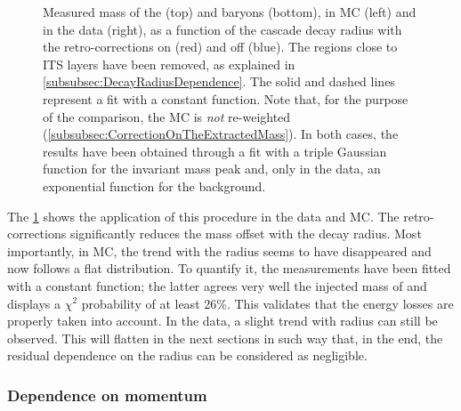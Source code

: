 \begin{figure}[p]
\hspace*{-2.cm}
\hspace*{-2.cm}
\caption{Measured mass of the \rmXi (top) and \rmOmega baryons (bottom), in MC (left) and in the data (right), as a function of the cascade decay radius with the retro-corrections on (red) and off (blue). The regions close to ITS layers have been removed, as explained in \Sec\ref{subsubsec:DecayRadiusDependence}. The solid and dashed lines represent a fit with a constant function. Note that, for the purpose of the comparison, the MC is \textit{not} re-weighted (\Sec\ref{subsubsec:CorrectionOnTheExtractedMass}). In both cases, the results have been obtained through a fit with a triple Gaussian function for the invariant mass peak and, only in the data, an exponential function for the background.}
	\label{fig:MassVsRadiusAfterRetrocorrection}
\end{figure}

The \fig\ref{fig:MassVsRadiusAfterRetrocorrection} shows the application of this procedure in the data and MC. The retro-corrections significantly reduces the mass offset with the decay radius. Most importantly, in MC, the trend with the radius seems to have disappeared and now follows a flat distribution. To quantify it, the measurements have been fitted with a constant function; the latter agrees very well the injected mass of \rmXi and displays a $\chi^{2}$ probability of at least 26\%. This validates that the energy losses are properly taken into account. In the data, a slight trend with radius can still be observed. This will flatten in the next sections in such way that, in the end, the residual dependence on the radius can be considered as negligible. 


\subsubsection{Dependence on momentum}
\label{subsubsec:MassDependenceOnPt}

